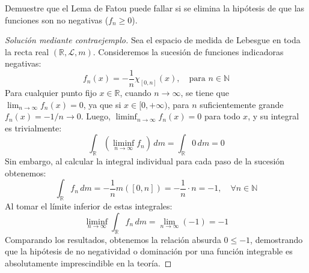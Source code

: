 \begin{ejercicio}
	Demuestre que el Lema de Fatou puede fallar si se elimina la hipótesis de que las funciones son no negativas ($f_n \ge 0$).
\end{ejercicio}
\begin{proof}[Solución mediante contraejemplo]
	Sea el espacio de medida de Lebesgue en toda la recta real $(\mathbb{R}, \mathcal{L}, m)$. Consideremos la sucesión de funciones indicadoras negativas:
	$$ f_n(x) = -\frac{1}{n} \chi_{[0, n]}(x), \quad \text{para } n \in \mathbb{N} $$
	Para cualquier punto fijo $x \in \mathbb{R}$, cuando $n \to \infty$, se tiene que $\lim_{n \to \infty} f_n(x) = 0$, ya que si $x \in [0, +\infty)$, para $n$ suficientemente grande $f_n(x) = -1/n \to 0$. Luego, $\liminf_{n \to \infty} f_n(x) = 0$ para todo $x$, y su integral es trivialmente:
	$$ \int_\mathbb{R} \left( \liminf_{n \to \infty} f_n \right) \, dm = \int_\mathbb{R} 0 \, dm = 0 $$
	Sin embargo, al calcular la integral individual para cada paso de la sucesión obtenemos:
	$$ \int_\mathbb{R} f_n \, dm = -\frac{1}{n} m([0, n]) = -\frac{1}{n} \cdot n = -1, \quad \forall n \in \mathbb{N} $$
	Al tomar el límite inferior de estas integrales:
	$$ \liminf_{n \to \infty} \int_\mathbb{R} f_n \, dm = \lim_{n \to \infty} (-1) = -1 $$
	Comparando los resultados, obtenemos la relación absurda $0 \le -1$, demostrando que la hipótesis de no negatividad o dominación por una función integrable es absolutamente imprescindible en la teoría.
\end{proof}


